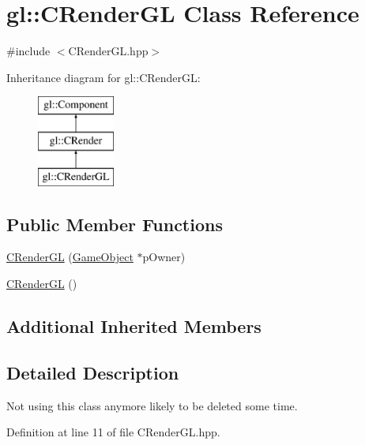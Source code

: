 \hypertarget{classgl_1_1_c_render_g_l}{\section{gl\-:\-:C\-Render\-G\-L Class Reference}
\label{classgl_1_1_c_render_g_l}
}


{\ttfamily \#include $<$C\-Render\-G\-L.\-hpp$>$}

Inheritance diagram for gl\-:\-:C\-Render\-G\-L\-:\begin{figure}[H]
\begin{center}
\leavevmode
\includegraphics[height=3.000000cm]{classgl_1_1_c_render_g_l}
\end{center}
\end{figure}
\subsection*{Public Member Functions}
\begin{DoxyCompactItemize}
\item 
\hyperlink{classgl_1_1_c_render_g_l_adef34a984bce1452ec64a5e5484805c5}{C\-Render\-G\-L} (\hyperlink{classgl_1_1_game_object}{Game\-Object} $\ast$p\-Owner)
\item 
\hyperlink{classgl_1_1_c_render_g_l_a2fa95472cc459c579fd13e6b19d7ee12}{C\-Render\-G\-L} ()
\end{DoxyCompactItemize}
\subsection*{Additional Inherited Members}


\subsection{Detailed Description}
Not using this class anymore likely to be deleted some time. 

Definition at line 11 of file C\-Render\-G\-L.\-hpp.



